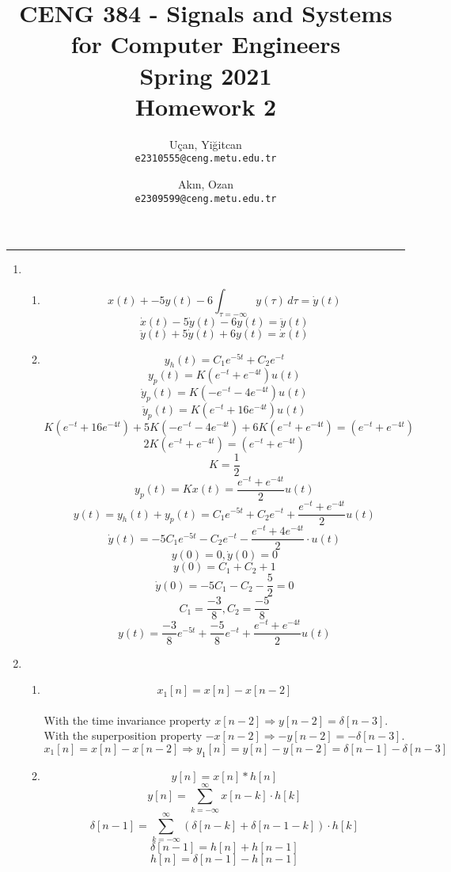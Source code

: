\documentclass[10pt,a4paper, margin=1in]{article}
\author{
  Uçan, Yiğitcan\\
  \texttt{e2310555@ceng.metu.edu.tr}
  \and
  Akın, Ozan\\
  \texttt{e2309599@ceng.metu.edu.tr}
}
\title{CENG 384 - Signals and Systems for Computer Engineers \\
Spring 2021 \\
Homework 2}
\begin{document}
\maketitle



\noindent\rule{19cm}{1.2pt}

\begin{enumerate}

\item %
    \begin{enumerate}
    \item %
    \[ x(t) + -5y(t) - 6  \int_{\tau=-\infty}^{} y(\tau) \,d\tau = \dot{y}(t)\]
    \[ \dot{x}(t) - 5\dot{y}(t) - 6y(t) = \ddot{y}(t)\]
    \[ \ddot{y}(t) + 5\dot{y}(t) + 6y(t) = \dot{x}(t)\]
    \item %
    \[ y_h(t) = C_1e^{-5t} + C_2e^{-t} \]
    \[ y_p(t) = K(e^{-t} + e^{-4t}) u(t) \]
    \[ \dot{y}_p(t) = K(-e^{-t} -4e^{-4t}) u(t) \]
    \[ \ddot{y}_p(t) = K(e^{-t} + 16 e^{-4t}) u(t) \]
    \[ K(e^{-t} + 16 e^{-4t}) + 5K(-e^{-t} -4e^{-4t}) + 6K(e^{-t} + e^{-4t}) = (e^{-t} + e^{-4t}) \]
    \[ 2K(e^{-t} + e^{-4t}) = (e^{-t} + e^{-4t}) \]
    \[ K = \frac{1}{2} \]
    \[ y_p(t) = K x(t) = \frac{e^{-t} + e^{-4t}}{2} u(t) \]
    \[ y(t) = y_h(t) + y_p(t) = C_1e^{-5t} + C_2e^{-t} + \frac{e^{-t} + e^{-4t}}{2} u(t) \]
    \[ \dot{y}(t) = -5C_1e^{-5t} - C_2e^{-t} - \frac{e^{-t} + 4e^{-4t}}{2} \cdot u(t) \]
    \[ y(0) = 0 , \dot{y}(0) = 0 \]
    \[ y(0) = C_1 + C_2 + 1 \]
    \[ \dot{y}(0) = -5C_1 - C_2 - \frac{5}{2} = 0 \]
    \[ C_1 = \frac{-3}{8}, C_2 = \frac{-5}{8} \]
    \[ y(t) = \frac{-3}{8} e^{-5t} + \frac{-5}{8} e^{-t} + \frac{e^{-t} + e^{-4t}}{2} u(t) \]
    \end{enumerate}

\item %
    \begin{enumerate}
    \item %
    \[ x_1[n] = x[n] - x[n-2] \] \\ 
    With the time invariance property $x[n-2] \Rightarrow y[n-2] = \delta[n-3]$. \\
    With the superposition property $-x[n-2] \Rightarrow -y[n-2] = -\delta[n-3]$. \\
    \[ x_1[n] = x[n] - x[n-2] \Rightarrow y_1[n] = y[n] - y[n-2] = \delta[n-1] - \delta[n-3]\]
    \item %
\[ y[n] = x[n] * h[n] \]
\[ y[n] = \sum_{k=-\infty}^{\infty} x[n-k] \cdot h[k] \]
\[ \delta[n-1] = \sum_{k=-\infty}^{\infty} (\delta[n-k] + \delta[n-1-k]) \cdot h[k] \]
\[ \delta[n-1] = h[n] + h[n-1] \]
\[ h[n] = \delta[n-1] - h[n-1] \]  


\end{enumerate}
\end{enumerate}
\end{document}
